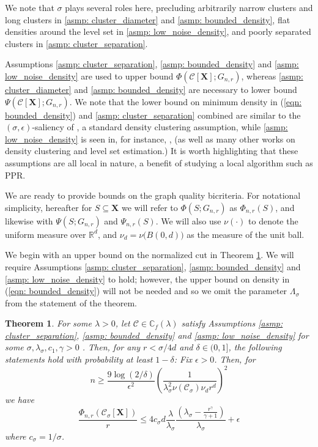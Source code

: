 \documentclass{article}
\newcommand{\Reals}{\mathbb{R}}
\newcommand{\Rd}{\Reals^d}
\newcommand{\1}{\mathbf{1}}
\newcommand{\Xbf}{\mathbf{X}}
\newcommand{\Cset}{\mathcal{C}}
\newcommand{\Csig}{\Cset_{\sigma}}
\theoremstyle{aldenthm}
\newtheorem{theorem}{Theorem}
\theoremstyle{aldenrmrk}
\begin{document}
We note that $\sigma$ plays several roles here, precluding arbitrarily narrow clusters and long clusters in \ref{asmp: cluster_diameter} and \ref{asmp: bounded_density}, flat densities around the level set in \ref{asmp: low_noise_density}, and poorly separated clusters in \ref{asmp: cluster_separation}.

Assumptions \ref{asmp: cluster_separation}, \ref{asmp: bounded_density} and \ref{asmp: low_noise_density} are used to upper bound $\Phi(\Cset[\Xbf]; G_{n,r})$, whereas \ref{asmp: cluster_diameter} and \ref{asmp: bounded_density} are necessary to lower bound $\Psi(\Cset[\Xbf]; G_{n,r})$. We note that the lower bound on minimum density in (\ref{eqn: bounded_density}) and \ref{asmp: cluster_separation} combined are similar to the $(\sigma,\epsilon)$-saliency of \cite{chaudhuri2010}, a standard density clustering assumption, while \ref{asmp: low_noise_density} is seen in, for instance, \cite{singh2009}, (as well as many other works on density clustering and level set estimation.) It is worth highlighting that these assumptions are all local in nature, a benefit of studying a local algorithm such as PPR.

We are ready to provide bounds on the graph quality bicriteria. For notational simplicity, hereafter for $S \subseteq \Xbf$ we will refer to $\Phi(S; G_{n,r})$ as $\Phi_{n,r}(S)$, and likewise with $\Psi(S; G_{n,r})$ and $\Psi_{n,r}(S)$. We will also use $\nu(\cdot)$ to denote the uniform measure over $\Rd$, and $\nu_d = \nu\bigl(B(0,d)\bigr)$ as the measure of the unit ball.

We begin with an upper bound on the normalized cut in Theorem \ref{thm: conductance_upper_bound}. We will require Assumptions \ref{asmp: cluster_separation}, \ref{asmp: bounded_density} and \ref{asmp: low_noise_density} to hold; however, the upper bound on density in (\ref{eqn: bounded_density}) will not be needed and so we omit the parameter $\Lambda_{\sigma}$ from the statement of the theorem.
\begin{theorem}
	\label{thm: conductance_upper_bound}
	For some $\lambda > 0$, let $\Cset \in \mathbb{C}_f(\lambda)$ satisfy Assumptions \ref{asmp: cluster_separation}, \ref{asmp: bounded_density} and \ref{asmp: low_noise_density} for some $\sigma, \lambda_{\sigma}, c_1, \gamma > 0$ . Then, for any $r < \sigma/4d$ and $\delta \in (0,1]$, the following statements hold with probability at least $1 - \delta$:  Fix $\epsilon > 0$. Then, for
		\begin{equation}
		\label{eqn: conductance_sample_complexity}
		n \geq \frac{9\log(2/\delta)}{\epsilon^2}\left(\frac{1}{ \lambda_{\sigma}^2 \nu(\Csig) \nu_d r^d}\right)^2 
		\end{equation}
		we have
		\begin{equation}
		\label{eqn: conductance_additive_error_bound}
		\frac{\Phi_{n,r}(\Csig[\mathbf{X}])}{r} \leq 4 c_{\sigma} d \frac{\lambda}{\lambda_{\sigma}} \frac{(\lambda_{\sigma} - \frac{r^{\gamma}}{\gamma+1})}{\lambda_{\sigma}} + \epsilon
		\end{equation}
	where $c_{\sigma} = 1 / \sigma$. 
\end{theorem}
\end{document}
